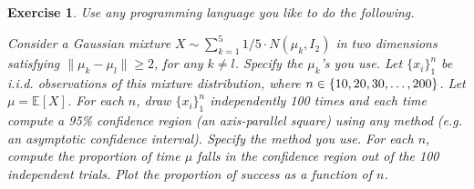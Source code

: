 \documentclass[12pt]{article}
\theoremstyle{colon}
\newtheorem{exercise}{Exercise}
\begin{document}
\clearpage

\begin{exercise}
  Use any programming language you like to do the following.

  Consider a Gaussian mixture $X \sim \sum_{k = 1}^5 1/5 \cdot N(\mu_k, I_2)$ in two dimensions satisfying $\lVert \mu_k - \mu_l \rVert \geq 2$, for any $k \neq l$. Specify the $\mu_k$'s you use. Let $\{ x_i \}_1^n$ be i.i.d. observations of this mixture distribution, where $n \in \{ 10, 20, 30, \mathellipsis, 200 \}$. Let $\mu = \mathbb{E}[X]$. For each $n$, draw $\{ x_i \}_1^n$ independently 100 times and each time compute a 95\% confidence region (an axis-parallel square) using any method (e.g. an asymptotic confidence interval). Specify the method you use. For each $n$, compute the proportion of time $\mu$ falls in the confidence region out of the 100 independent trials. Plot the proportion of success as a function of $n$.
\end{exercise}
\end{document}
